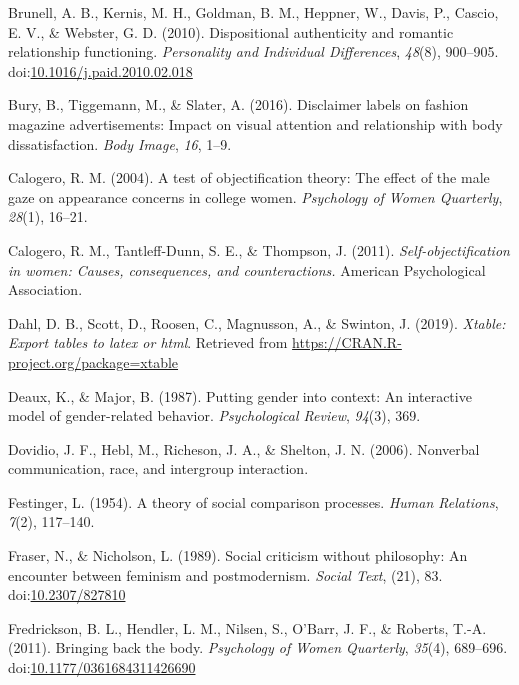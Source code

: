 \documentclass[
  man]{apa6}
\begin{document}
\hypertarget{ref-brunelletal2010}{}
Brunell, A. B., Kernis, M. H., Goldman, B. M., Heppner, W., Davis, P.,
Cascio, E. V., \& Webster, G. D. (2010). Dispositional authenticity and
romantic relationship functioning. \emph{Personality and Individual
Differences}, \emph{48}(8), 900--905.
doi:\href{https://doi.org/10.1016/j.paid.2010.02.018}{10.1016/j.paid.2010.02.018}

\hypertarget{ref-bury2016}{}
Bury, B., Tiggemann, M., \& Slater, A. (2016). Disclaimer labels on
fashion magazine advertisements: Impact on visual attention and
relationship with body dissatisfaction. \emph{Body Image}, \emph{16},
1--9.

\hypertarget{ref-calogero2004test}{}
Calogero, R. M. (2004). A test of objectification theory: The effect of
the male gaze on appearance concerns in college women. \emph{Psychology
of Women Quarterly}, \emph{28}(1), 16--21.

\hypertarget{ref-calogero2011}{}
Calogero, R. M., Tantleff-Dunn, S. E., \& Thompson, J. (2011).
\emph{Self-objectification in women: Causes, consequences, and
counteractions.} American Psychological Association.

\hypertarget{ref-R-xtable}{}
Dahl, D. B., Scott, D., Roosen, C., Magnusson, A., \& Swinton, J.
(2019). \emph{Xtable: Export tables to latex or html}. Retrieved from
\url{https://CRAN.R-project.org/package=xtable}

\hypertarget{ref-deaux1987putting}{}
Deaux, K., \& Major, B. (1987). Putting gender into context: An
interactive model of gender-related behavior. \emph{Psychological
Review}, \emph{94}(3), 369.

\hypertarget{ref-dovidio2006nonverbal}{}
Dovidio, J. F., Hebl, M., Richeson, J. A., \& Shelton, J. N. (2006).
Nonverbal communication, race, and intergroup interaction.

\hypertarget{ref-festinger1954theory}{}
Festinger, L. (1954). A theory of social comparison processes.
\emph{Human Relations}, \emph{7}(2), 117--140.

\hypertarget{ref-frasernicholson1989}{}
Fraser, N., \& Nicholson, L. (1989). Social criticism without
philosophy: An encounter between feminism and postmodernism.
\emph{Social Text}, (21), 83.
doi:\href{https://doi.org/10.2307/827810}{10.2307/827810}

\hypertarget{ref-fredricksonetal2011}{}
Fredrickson, B. L., Hendler, L. M., Nilsen, S., O'Barr, J. F., \&
Roberts, T.-A. (2011). Bringing back the body. \emph{Psychology of Women
Quarterly}, \emph{35}(4), 689--696.
doi:\href{https://doi.org/10.1177/0361684311426690}{10.1177/0361684311426690}
\end{document}

